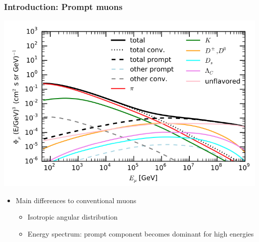 \documentclass[aspectratio=1610, 9pt]{beamer}
\begin{document}
\begin{frame}
  \frametitle{Introduction: Prompt muons}
  \includegraphics[scale=0.25]{Plots/Prompt vs conventional flux}
  \begin{itemize}
    \item Main differences to conventional muons \cite{fedynitch2015calculation}
    \begin{itemize}
      \item Isotropic angular distribution
      \item Energy spectrum: prompt component becomes dominant for high energies
    \end{itemize}
  \end{itemize}
\end{frame}
\end{document}
